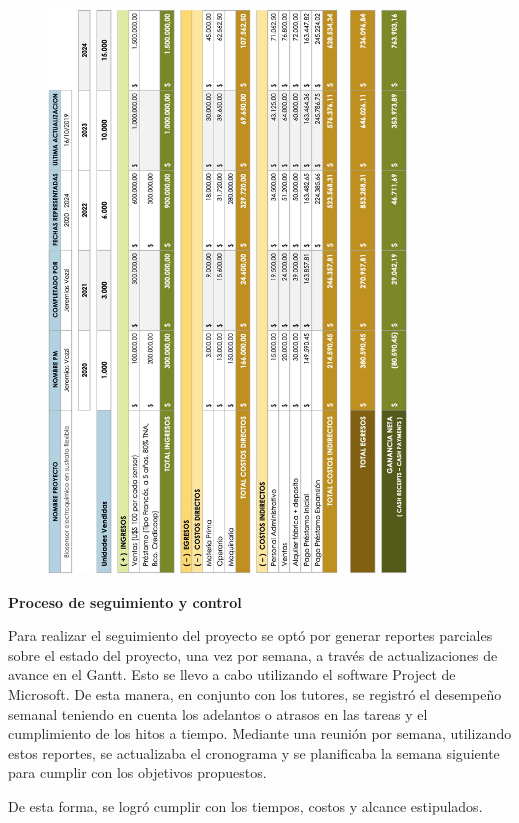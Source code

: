 \begin{figure}[H]
  \centering
    \includegraphics[width=0.85\textwidth]{Figuras/CashFlow}
  \label{fig:CashFlow}
\end{figure}

\begin{flushleft}
{\Large \textbf{Proceso de seguimiento y control}}
\end{flushleft}
Para realizar el seguimiento del proyecto se optó por generar reportes parciales sobre el estado del proyecto, una vez por semana, a través de actualizaciones de avance en el Gantt. Esto se llevo a cabo utilizando el software Project de Microsoft. De esta manera, en conjunto con los tutores, se registró el desempeño semanal teniendo en cuenta los adelantos o atrasos en las tareas y el cumplimiento de los hitos a tiempo. Mediante una reunión por semana, utilizando estos reportes, se actualizaba el cronograma y se planificaba la semana siguiente para cumplir con los objetivos propuestos.

De esta forma, se logró cumplir con los tiempos, costos y alcance estipulados.